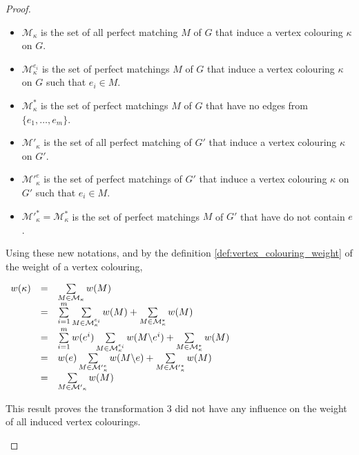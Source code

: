 \begin{proof}
\begin{enumerate}
            \begin{itemize}
                \item $\mathcal{M}_\kappa$ is the set of all perfect matching $M$ of $G$ that induce a vertex colouring $\kappa$ on $G$.
                \item $\mathcal{M}_\kappa^{e_i}$ is the set of perfect matchings $M$ of $G$ that induce a vertex colouring $\kappa$ on $G$ such that $e_i \in M$.
                \item $\mathcal{M}_\kappa^{*}$ is the set of perfect matchings $M$ of $G$ that have no edges from $\{e_1, \dots, e_m\}$.
                \item $\mathcal{M'}_\kappa$ is the set of all perfect matching of $G'$ that induce a vertex colouring $\kappa$ on $G'$.
                \item $\mathcal{M'}_\kappa^{e}$ is the set of perfect matchings of $G'$ that induce a vertex colouring $\kappa$ on $G'$ such that $e_i \in M$.
                \item $\mathcal{M'}_\kappa^{*} = \mathcal{M}_\kappa^{*}$ is the set of perfect matchings $M$ of $G'$ that have do not contain $e$.
            \end{itemize}

            Using these new notations, and by the definition \ref{def:vertex_colouring_weight} of the weight of a vertex colouring, 

            \begin{center}
                $\begin{array}{r c l}
                    w(\kappa) & = & \sum\limits_{M \in \mathcal{M}_\kappa} w(M)  \\
                              & = & \sum\limits_{i = 1}^m \sum\limits_{M \in \mathcal{M}_\kappa^{e_i}} w(M) + \sum\limits_{M \in \mathcal{M}_\kappa^{*}} w(M) \\
                              & = & \sum\limits_{i = 1}^m w(e^i) \sum\limits_{M \in \mathcal{M}_\kappa^{e_i}} w(M \backslash e^i) + \sum\limits_{M \in \mathcal{M}_\kappa^{*}} w(M) \\
                              & = & w(e) \sum\limits_{M \in \mathcal{M'}_\kappa^{e}} w(M \backslash e) + \sum\limits_{M \in \mathcal{M'}_\kappa^{*}} w(M) \\
                              & = & \sum\limits_{M \in \mathcal{M'}_\kappa} w(M)
                \end{array}$
            \end{center}

            This result proves the transformation 3 did not have any influence on the weight of all induced vertex colourings.
    \end{enumerate}
\end{proof}

